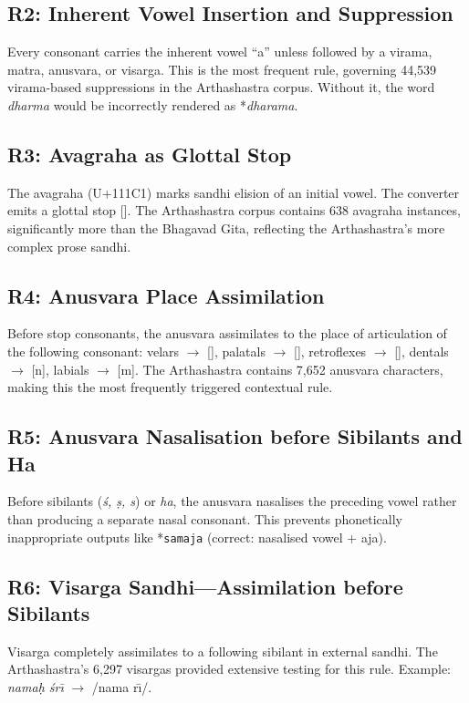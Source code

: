 \documentclass[11pt]{article}
\begin{document}
\subsection{R2: Inherent Vowel Insertion and Suppression}
Every consonant carries the inherent vowel ``a'' unless followed by a virama, matra, anusvara, or visarga. This is the most frequent rule, governing 44,539 virama-based suppressions in the Arthashastra corpus. Without it, the word \textit{dharma} would be incorrectly rendered as *\textit{dharama}.

\subsection{R3: Avagraha as Glottal Stop}
The avagraha (U+111C1) marks sandhi elision of an initial vowel. The converter emits a glottal stop []. The Arthashastra corpus contains 638 avagraha instances, significantly more than the Bhagavad Gita, reflecting the Arthashastra's more complex prose sandhi.

\subsection{R4: Anusvara Place Assimilation}
Before stop consonants, the anusvara assimilates to the place of articulation of the following consonant: velars $\rightarrow$ [], palatals $\rightarrow$ [\textipa{\textltailn}], retroflexes $\rightarrow$ [], dentals $\rightarrow$ [n], labials $\rightarrow$ [m]. The Arthashastra contains 7,652 anusvara characters, making this the most frequently triggered contextual rule.

\subsection{R5: Anusvara Nasalisation before Sibilants and Ha}
Before sibilants (\textit{\'{s}, \d{s}, s}) or \textit{ha}, the anusvara nasalises the preceding vowel rather than producing a separate nasal consonant. This prevents phonetically inappropriate outputs like *\texttt{samaja} (correct: nasalised vowel + aja).

\subsection{R6: Visarga Sandhi---Assimilation before Sibilants}
Visarga completely assimilates to a following sibilant in external sandhi. The Arthashastra's 6,297 visargas provided extensive testing for this rule. Example: \textit{nama\d{h} \'{s}r\={\i}} $\rightarrow$ /nama r\={\i}\textlengthmark/.
\end{document}
